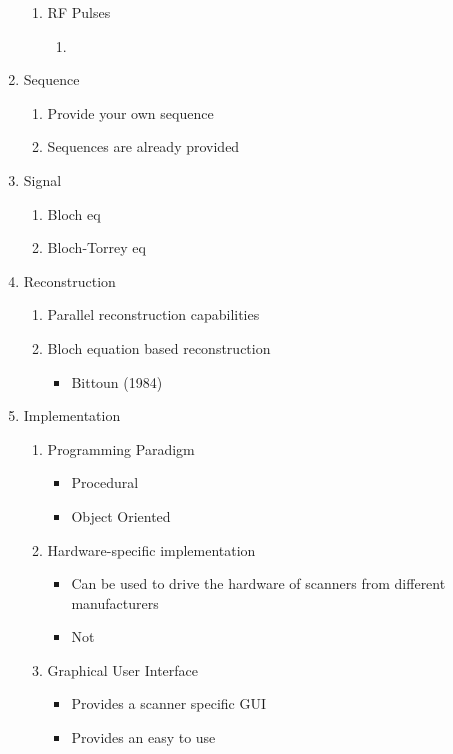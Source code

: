 \documentclass[11pt]{article}
\begin{document}
\begin{enumerate}
\begin{enumerate}
		\item RF Pulses
		\begin{enumerate}
			\item 
		\end{enumerate}
	\end{enumerate}
	
	
	\item Sequence
	\begin{enumerate}
		\item Provide your own sequence
		\item Sequences are already provided
	\end{enumerate}
	
	\item Signal
	\begin{enumerate}
		\item Bloch eq
		\item Bloch-Torrey eq
	\end{enumerate}
	
	\item Reconstruction
	\begin{enumerate}
		\item Parallel reconstruction capabilities
		\item Bloch equation based reconstruction
		\begin{itemize}
			\item Bittoun (1984)
		\end{itemize}
	\end{enumerate}
	
	\item Implementation
	\begin{enumerate}
		\item Programming Paradigm
		\begin{itemize}
			\item Procedural
			\item Object Oriented
		\end{itemize}
		
		\item Hardware-specific implementation
		\begin{itemize}
			\item Can be used to drive the hardware of scanners from different manufacturers
			\item Not
		\end{itemize}
		
		\item Graphical User Interface
		\begin{itemize}
			\item Provides a scanner specific GUI
			\item Provides an easy to use 
		\end{itemize}
		
	\end{enumerate}

\end{enumerate}
\end{document}
